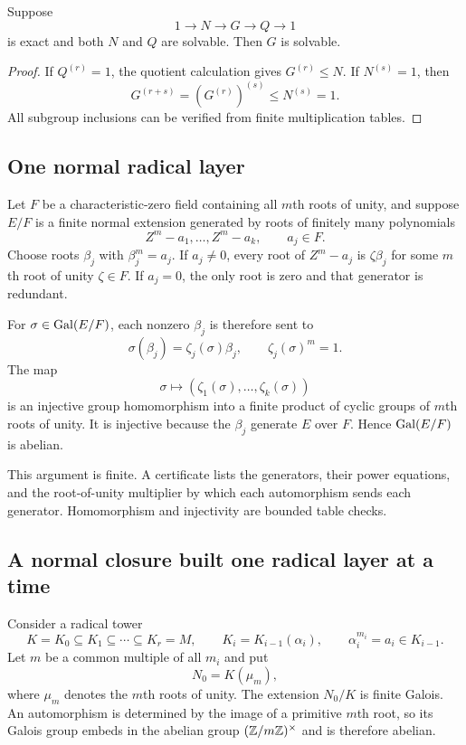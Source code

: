\begin{lemma}[Extensions]
Suppose
\[
 1\longrightarrow N\longrightarrow G\longrightarrow Q\longrightarrow1
\]
is exact and both $N$ and $Q$ are solvable.  Then $G$ is solvable.
\end{lemma}

\begin{proof}
If $Q^{(r)}=1$, the quotient calculation gives $G^{(r)}\le N$.  If
$N^{(s)}=1$, then
\[
 G^{(r+s)}=(G^{(r)})^{(s)}\le N^{(s)}=1.
\]
All subgroup inclusions can be verified from finite multiplication tables.
\end{proof}

\subsection{One normal radical layer}

Let $F$ be a characteristic-zero field containing all $m$th roots of unity,
and suppose $E/F$ is a finite normal extension generated by roots of finitely
many polynomials
\[
 Z^m-a_1,\ldots,Z^m-a_k,
 \qquad a_j\in F.
\]
Choose roots $\beta_j$ with $\beta_j^m=a_j$.  If $a_j\ne0$, every root of
$Z^m-a_j$ is $\zeta\beta_j$ for some $m$th root of unity $\zeta\in F$.
If $a_j=0$, the only root is zero and that generator is redundant.

For $\sigma\in\operatorname{Gal}(E/F)$, each nonzero $\beta_j$ is therefore sent to
\[
 \sigma(\beta_j)=\zeta_j(\sigma)\beta_j,
 \qquad \zeta_j(\sigma)^m=1.
\]
The map
\[
 \sigma\longmapsto
 (\zeta_1(\sigma),\ldots,\zeta_k(\sigma))
\]
is an injective group homomorphism into a finite product of cyclic groups of
$m$th roots of unity.  It is injective because the $\beta_j$ generate $E$ over
$F$.  Hence $\operatorname{Gal}(E/F)$ is abelian.

This argument is finite.  A certificate lists the generators, their power
equations, and the root-of-unity multiplier by which each automorphism sends
each generator.  Homomorphism and injectivity are bounded table checks.

\subsection{A normal closure built one radical layer at a time}

Consider a radical tower
\[
 K=K_0\subseteq K_1\subseteq\cdots\subseteq K_r=M,
 \qquad
 K_i=K_{i-1}(\alpha_i),
 \qquad
 \alpha_i^{m_i}=a_i\in K_{i-1}.
 \tag{R1}\label{eq:radical-tower}
\]
Let $m$ be a common multiple of all $m_i$ and put
\[
 N_0=K(\mu_m),
\]
where $\mu_m$ denotes the $m$th roots of unity.  The extension $N_0/K$ is
finite Galois.  An automorphism is determined by the image of a primitive
$m$th root, so its Galois group embeds in the abelian group
$(\mathbb Z/m\mathbb Z)^\times$ and is therefore abelian.

